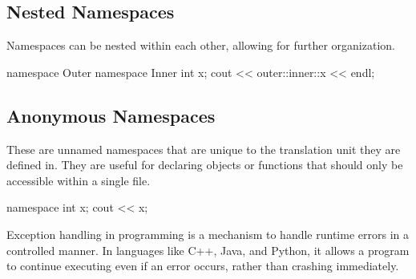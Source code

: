 \documentclass{report}
\begin{document}
\begin{concept}
    \bigbreak \noindent 
    \subsection{Nested Namespaces} 
    \bigbreak \noindent 
    Namespaces can be nested within each other, allowing for further organization. 
    \bigbreak \noindent 
    \begin{cppcode}
    namespace Outer {
        namespace Inner {
            int x;
        }
    }
    cout << outer::inner::x  << endl;
    \end{cppcode}

    \bigbreak \noindent 
    \subsection{Anonymous Namespaces}
    \bigbreak \noindent 
    These are unnamed namespaces that are unique to the translation unit they are defined in. They are useful for declaring objects or functions that should only be accessible within a single file. 
    \bigbreak \noindent 
    \begin{cppcode}
    namespace {
        int x;
    }
    cout << x; 
    \end{cppcode}

    \pagebreak 
    \bigbreak \noindent 
    \begin{concept}
        Exception handling in programming is a mechanism to handle runtime errors in a controlled manner. In languages like C++, Java, and Python, it allows a program to continue executing even if an error occurs, rather than crashing immediately. 
    \end{concept}
    \bigbreak \noindent 

\end{concept}
\end{document}
